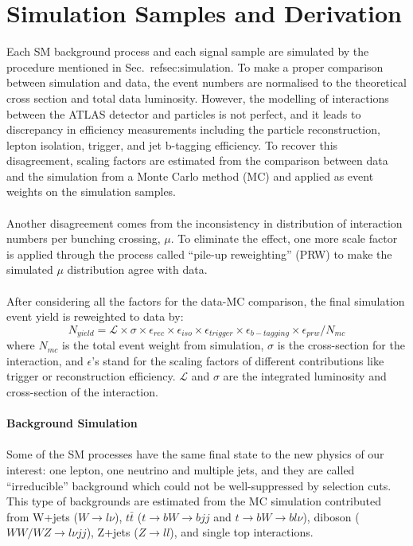 \section{Simulation Samples and Derivation}
Each SM background process and each signal sample are simulated by the procedure mentioned in Sec.~ref{sec:simulation}.  To make a proper comparison between simulation and data, the event numbers are normalised to the theoretical cross section and total data luminosity. However, the modelling of interactions between the ATLAS detector and particles is not perfect, and it leads to discrepancy in efficiency measurements including the particle reconstruction, lepton isolation, trigger, and jet b-tagging efficiency. To recover this disagreement, scaling factors are estimated from the comparison between data and the simulation from a Monte Carlo method (MC) and applied as event weights on the simulation samples. 
\\
\\Another disagreement comes from the inconsistency in distribution of interaction numbers per bunching crossing, $\mu$. To eliminate the effect, one more scale factor is applied through the process called ``pile-up reweighting'' (PRW) to make the simulated $\mu$ distribution agree with data. 
\\
\\After considering all the factors for the data-MC comparison, the final simulation event yield is reweighted to data by:
\begin{equation}
N_{yield} = \mathcal{L}\times \sigma \times \epsilon_{rec} \times \epsilon_{iso} \times \epsilon_{trigger} \times \epsilon_{b-tagging} \times \epsilon_{prw} / N_{mc}
\end{equation}
where $N_{mc}$ is the total event weight from simulation, $\sigma$ is the cross-section for the interaction, and $\epsilon$'s stand for the scaling factors of different contributions like trigger or reconstruction efficiency. $\mathcal{L}$ and $\sigma$ are the integrated luminosity and cross-section of the interaction.
\\
\\{\bf Background Simulation}
\\
\\Some of the SM processes have the same final state to the new physics of our interest: one lepton, one neutrino and multiple jets, and they are called ``irreducible'' background which could not be well-suppressed by selection cuts. This type of backgrounds are estimated from the MC simulation contributed from W+jets ($W\rightarrow l\nu$), $t\bar{t}$ ($t\rightarrow bW \rightarrow bjj$ and $t\rightarrow bW \rightarrow bl\nu$), diboson ($WW/WZ\rightarrow l\nu jj$), Z+jets ($Z\rightarrow ll$), and single top interactions.  
